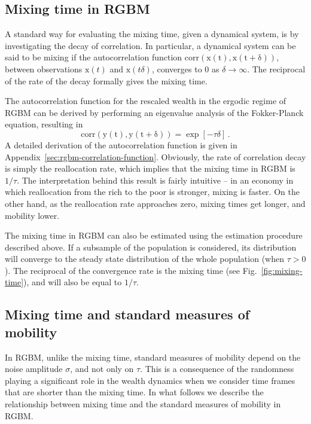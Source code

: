 \documentclass[11pt]{article}
\newcommand{\fref}[1]{Fig.~\ref{fig:#1}}
\newcommand{\be}{\begin{equation}}
\newcommand{\ee}{\end{equation}}
\numberwithin{equation}{section}
\begin{document}
\subsection{Mixing time in RGBM}

A standard way for evaluating the mixing time, given a dynamical system, is by investigating the decay of correlation. In particular, a dynamical system can be said to be mixing if the autocorrelation function $\mathrm{corr(\mathrm{x}(t), \mathrm{x}(t+\delta))}$, between observations $\mathrm{x}(t)$ and $\mathrm{x}(t\delta)$, converges to $0$ as $\delta \to \infty$. The reciprocal of the rate of the decay formally gives the mixing time.

The autocorrelation function for the rescaled wealth in the ergodic regime of RGBM can be derived by performing an eigenvalue analysis of the Fokker-Planck equation, resulting in
%
\be
\mathrm{corr(y(t), y(t+\delta))} = \exp\left[ -\tau \delta \right]\,.
\label{eq:rgbm-correlation}
\ee
%
A detailed derivation of the autocorrelation function is given in Appendix~\ref{sec:rgbm-correlation-function}. Obviously, the rate of correlation decay is simply the reallocation rate, which implies that the mixing time in RGBM is $1/\tau$. The interpretation behind this result is fairly intuitive -- in an economy in which reallocation from the rich to the poor is stronger, mixing is faster. On the other hand, as the reallocation rate approaches zero, mixing times get longer, and mobility lower.

The mixing time in RGBM can also be estimated using the estimation procedure described above. If a subsample of the population is considered, its distribution will converge to the steady state distribution of the whole population (when $\tau > 0$). The reciprocal of the convergence rate is the mixing time (see \fref{mixing-time}), and will also be equal to $1/\tau$.

\subsection{Mixing time and standard measures of mobility}\label{sec:measures}

In RGBM, unlike the mixing time, standard measures of mobility depend on the noise amplitude $\sigma$, and not only on $\tau$. This is a consequence of the randomness playing a significant role in the wealth dynamics when we consider time frames that are shorter than the mixing time. In what follows we describe the relationship between mixing time and the standard measures of mobility in RGBM.
\end{document}
